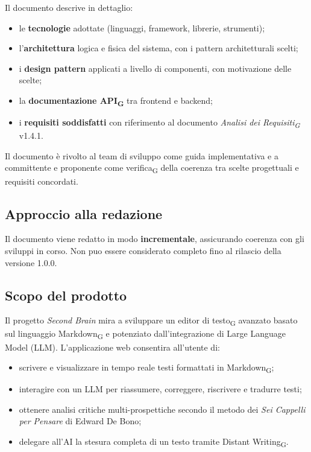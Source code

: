 \documentclass[11pt,a4paper]{article}
\newcommand{\gls}[1]{#1\textsubscript{G}}
\begin{document}
Il documento descrive in dettaglio:
\begin{itemize}
  \item le \textbf{tecnologie} adottate (linguaggi, framework, librerie, strumenti);
  \item l'\textbf{architettura} logica e fisica del sistema, con i pattern architetturali scelti;
  \item i \textbf{design pattern} applicati a livello di componenti, con motivazione delle scelte;
  \item la \textbf{documentazione \gls{API}} tra frontend e backend;
  \item i \textbf{requisiti soddisfatti} con riferimento al documento \textit{\gls{Analisi dei Requisiti}} v1.4.1.
\end{itemize}
 
Il documento è rivolto al team di sviluppo come guida implementativa e a
committente e proponente come \gls{verifica} della coerenza tra scelte progettuali e requisiti concordati.
 
\subsection{Approccio alla redazione}
Il documento viene redatto in modo \textbf{incrementale}, assicurando coerenza con gli sviluppi in corso. Non puo essere considerato completo fino al rilascio della versione 1.0.0.

\subsection{Scopo del prodotto}
Il progetto \textit{Second Brain} mira a sviluppare un \gls{editor di testo} avanzato basato sul linguaggio \gls{Markdown} e potenziato dall'integrazione di Large Language Model (LLM).
L'applicazione web consentira all'utente di:
\begin{itemize}
  \item scrivere e visualizzare in tempo reale testi formattati in \gls{Markdown};
  \item interagire con un LLM per riassumere, correggere, riscrivere e tradurre testi;
  \item ottenere analisi critiche multi-prospettiche secondo il metodo dei \textit{Sei Cappelli per Pensare} di Edward De Bono;
  \item delegare all'AI la stesura completa di un testo tramite \gls{Distant Writing}.
\end{itemize}
 
\end{document}
